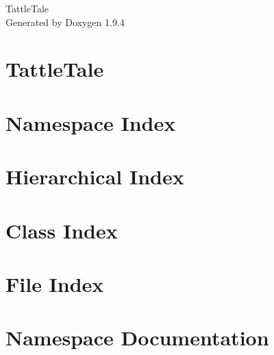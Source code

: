 \documentclass[twoside]{book}
\newcommand{\+}{\discretionary{\mbox{\scriptsize$\hookleftarrow$}}{}{}}
\newcommand{\clearemptydoublepage}{%
    \newpage{\pagestyle{empty}\cleardoublepage}%
  }
\begin{document}
  \raggedbottom
    \hypersetup{pageanchor=false,
                bookmarksnumbered=true,
                pdfencoding=unicode
               }
  \begin{titlepage}
  \vspace*{7cm}
  \begin{center}%
  {\Large Tattle\+Tale}\\
  \vspace*{1cm}
  {\large Generated by Doxygen 1.9.4}\\
  \end{center}
  \end{titlepage}
  \clearemptydoublepage
  \tableofcontents
  \clearemptydoublepage
  \hypersetup{pageanchor=true}
\chapter{Tattle\+Tale}
\label{index}\hypertarget{index}{}
\chapter{Namespace Index}

\chapter{Hierarchical Index}

\chapter{Class Index}

\chapter{File Index}

\chapter{Namespace Documentation}

\end{document}
